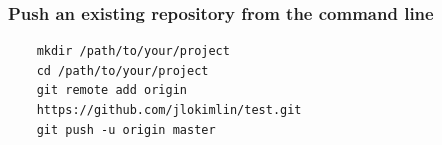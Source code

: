 %
%
\begin{frame}[fragile]
  \frametitle{
    Push an existing repository from the command line
  }

  \begin{lstlisting}
    mkdir /path/to/your/project
    cd /path/to/your/project
    git remote add origin
    https://github.com/jlokimlin/test.git
    git push -u origin master
  \end{lstlisting}

\end{frame}
